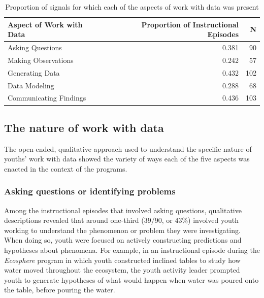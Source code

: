 \documentclass[]{book}
\theoremstyle{definition}
\theoremstyle{definition}
\theoremstyle{definition}
\theoremstyle{remark}
\begin{document}
\begin{table}

\caption{\label{tab:unnamed-chunk-9}Proportion of signals for which each of the aspects of work with data was present}
\centering
\begin{tabular}[t]{lrr}
\toprule
Aspect of Work with Data & Proportion of Instructional Episodes & N\\
\midrule
Asking Questions & 0.381 & 90\\
Making Observations & 0.242 & 57\\
Generating Data & 0.432 & 102\\
Data Modeling & 0.288 & 68\\
Communicating Findings & 0.436 & 103\\
\bottomrule
\end{tabular}
\end{table}

\subsection{The nature of work with
data}\label{the-nature-of-work-with-data}

The open-ended, qualitative approach used to understand the specific
nature of youths' work with data showed the variety of ways each of the
five aspects was enacted in the context of the programs.

\subsubsection{Asking questions or identifying
problems}\label{asking-questions-or-identifying-problems}

Among the instructional episodes that involved asking questions,
qualitative descriptions revealed that around one-third (39/90, or 43\%)
involved youth working to understand the phenomenon or problem they were
investigating. When doing so, youth were focused on actively
constructing predictions and hypotheses about phenomena. For example, in
an instructional episode during the \emph{Ecosphere} program in which
youth constructed inclined tables to study how water moved throughout
the ecosystem, the youth activity leader prompted youth to generate
hypotheses of what would happen when water was poured onto the table,
before pouring the water.
\end{document}
